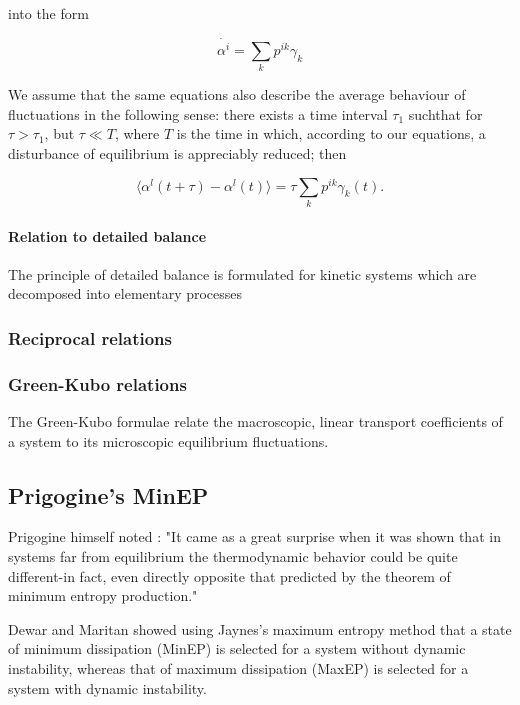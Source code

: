 \documentclass[a4paper,12pt,nofootinbib]{article}
\begin{document}
into the form

\begin{equation}
  \dot{\alpha^i}= \sum_k p^{ik} \gamma_k
\end{equation}

We assume that the same equations also describe the average behaviour of fluctuations in the following sense: there exists a time interval $\tau_1$ suchthat for $\tau > \tau_1$, but $\tau \ll T$, where $T$ is the time in which, according to our equations, a disturbance of equilibrium is appreciably reduced; then

\begin{equation}
    \langle \alpha^l(t+\tau)- \alpha^l (t) \rangle = \tau \sum_k p^{ik} \gamma_k(t).
\end{equation}
		

\paragraph{Relation to detailed balance}

The principle of detailed balance is formulated for kinetic systems which are decomposed into elementary processes
\subsubsection{Reciprocal relations}

\subsubsection{Green-Kubo relations}

The Green-Kubo formulae relate the macroscopic, linear transport coefficients of a system to its microscopic equilibrium fluctuations.


\subsection{Prigogine's MinEP}
Prigogine himself noted \cite{Prigogine:1979ul}:
"It came as a great surprise when it was shown that in systems far from equilibrium the thermodynamic behavior could be quite different-in fact, even directly opposite that predicted by the theorem of minimum entropy production."

Dewar and Maritan \cite{Dewar:2014ek} showed using Jaynes's maximum entropy method that a state of minimum dissipation (MinEP) is selected for a system without dynamic instability, whereas that of maximum dissipation (MaxEP) is selected for a system with dynamic instability.
\end{document}
